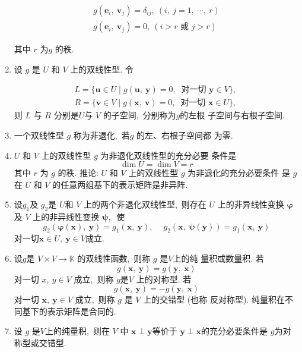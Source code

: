 \begin{enumerate}
		$$\begin{array}{l}
			g\left(\boldsymbol{e}_{i},\  \boldsymbol{v}_{j}\right)=\delta_{i j},\ (i,\  j=1,\  \cdots,\  r) \\
			g\left(\boldsymbol{e}_{i},\  \boldsymbol{v}_{j}\right)=0,\ (i>r \text { 或 } j>r)
		\end{array}$$
		
		其中 $ r$  为$  g$  的秩.
		\item 设  $g $ 是 $ U $ 和 $ V$  上的双线性型. 令
		
		$$\begin{array}{l}
			L=\{\boldsymbol{u} \in U \mid g(\boldsymbol{u},\  \boldsymbol{y})=0,\  \text { 对一切 } \boldsymbol{y} \in V\},\  \\
			R=\{\boldsymbol{v} \in V \mid g(\boldsymbol{x},\  \boldsymbol{v})=0,\  \text { 对一切 } \boldsymbol{x} \in U\},\ 
		\end{array}$$
		则 $ L $ 与  $R $ 分别是$  U  $与 $ V$  的子空间,\  分别称为$  g  $的左根 子空间与右根子空间.
		\item 一个双线性型  $g$  称为非退化,\  若$  g $ 的左、右根子空间都 为零.
		\item $ U $ 和 $ V $ 上的双线性型 $ g $ 为非退化双线性型的充分必要 条件是
		$$\operatorname{dim} U=\operatorname{dim} V=r$$
		其中 $ r $ 为 $ g $ 的秩.
		推论: $ U $ 和 $ V $ 上的双线性型  $g $ 为非退化的充分必要条件 是 $ g$  在  $U $ 和 $ V$  的任意两组基下的表示矩阵是非异阵.
		\item 设$  g_{1}  $及  $g_{2}  $是  $U  $和 $ V$  上的两个非退化双线性型,\  则存在 $ U $ 上的非异线性变换 $ \boldsymbol{\varphi}  $ 及 $ V$  上的非异线性变换 $ \boldsymbol{\psi}  ,\ $ 使
		$$g_{2}(\boldsymbol{\varphi}(\boldsymbol{x}),\  \boldsymbol{y})=g_{1}(\boldsymbol{x},\  \boldsymbol{y}),\  \quad g_{2}(\boldsymbol{x},\  \boldsymbol{\psi}(\boldsymbol{y}))=g_{1}(\boldsymbol{x},\  \boldsymbol{y})$$
		对一切$  \boldsymbol{x} \in U,\  \boldsymbol{y} \in V  $成立.
		\item 设$  g  $是  $V \times V \rightarrow \mathbb{K} $ 的双线性函数,\  则称  $g$  是$  V  $上的纯 量积或数量积. 若
		$$g(\boldsymbol{x},\  \boldsymbol{y})=g(\boldsymbol{y},\  \boldsymbol{x})$$
		对一切  $x,\  y \in V$  成立,\  则称 $ g  $是$  V$  上的对称型. 若
		$$g(\boldsymbol{x},\  \boldsymbol{y})=-g(\boldsymbol{y},\  \boldsymbol{x})$$
		对一切 $ \boldsymbol{x} ,\  \boldsymbol{y}  \in V $ 成立,\  则称  $g$  是  $V$  上的交错型 (也称 反对称型).
		纯量积在不同基下的表示矩阵是合同的.
		\item 设  $g $ 是$  V  $上的纯量积,\  则在 $ V$  中  $\boldsymbol{x} \perp \boldsymbol{y}   $等价于  $\boldsymbol{y}  \perp \boldsymbol{x}   $的充分必要条件是 $ g  $为对称型或交错型.

\end{enumerate}
